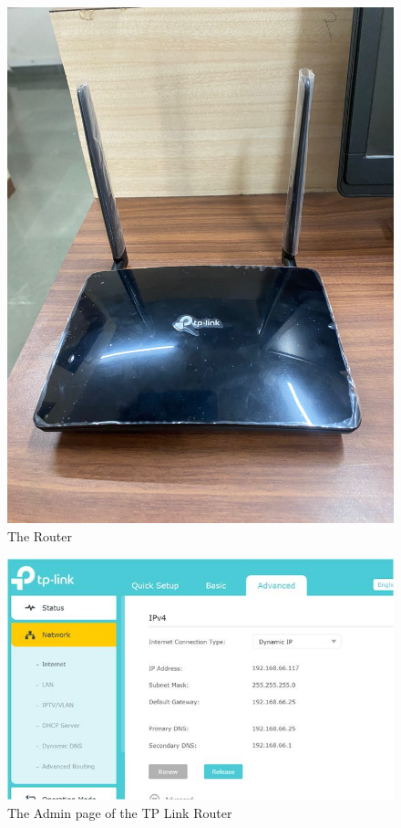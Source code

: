 \documentclass[11pt]{article}
\begin{document}
\begin{figure}[H]
    \centering
    \includegraphics[width=.85\textwidth]{lab router/router 4.jpeg}
    \caption{The Router}
\end{figure}

\begin{figure}[H]
    \centering
    \includegraphics[width=.85\textwidth]{lab router/tp link 1.png}
    \caption{The Admin page of the TP Link Router}
\end{figure}
\end{document}

